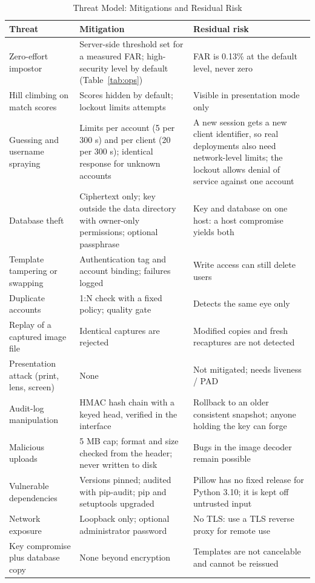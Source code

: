 \documentclass[conference]{IEEEtran}
\begin{document}
\begin{table}[!t]
\caption{Threat Model: Mitigations and Residual Risk}
\label{tab:threat}
\centering\footnotesize
\begin{tabular}{L{0.22\columnwidth}L{0.38\columnwidth}L{0.34\columnwidth}}
\toprule
\textbf{Threat} & \textbf{Mitigation} & \textbf{Residual risk} \\
\midrule
Zero-effort impostor & Server-side threshold set for a measured FAR; high-security level by default (Table~\ref{tab:ops}) & FAR is 0.13\% at the default level, never zero \\
Hill climbing on match scores & Scores hidden by default; lockout limits attempts & Visible in presentation mode only \\
Guessing and username spraying & Limits per account (5 per 300 s) and per client (20 per 300 s); identical response for unknown accounts & A new session gets a new client identifier, so real deployments also need network-level limits; the lockout allows denial of service against one account \\
Database theft & Ciphertext only; key outside the data directory with owner-only permissions; optional passphrase & Key and database on one host: a host compromise yields both \\
Template tampering or swapping & Authentication tag and account binding; failures logged & Write access can still delete users \\
Duplicate accounts & 1:N check with a fixed policy; quality gate & Detects the same eye only \\
Replay of a captured image file & Identical captures are rejected & Modified copies and fresh recaptures are not detected \\
Presentation attack (print, lens, screen) & None & Not mitigated; needs liveness / PAD \\
Audit-log manipulation & HMAC hash chain with a keyed head, verified in the interface & Rollback to an older consistent snapshot; anyone holding the key can forge \\
Malicious uploads & 5 MB cap; format and size checked from the header; never written to disk & Bugs in the image decoder remain possible \\
Vulnerable dependencies & Versions pinned; audited with pip-audit; pip and setuptools upgraded & Pillow has no fixed release for Python 3.10; it is kept off untrusted input \\
Network exposure & Loopback only; optional administrator password & No TLS: use a TLS reverse proxy for remote use \\
Key compromise plus database copy & None beyond encryption & Templates are not cancelable and cannot be reissued \\
\bottomrule
\end{tabular}
\end{table}
\end{document}

